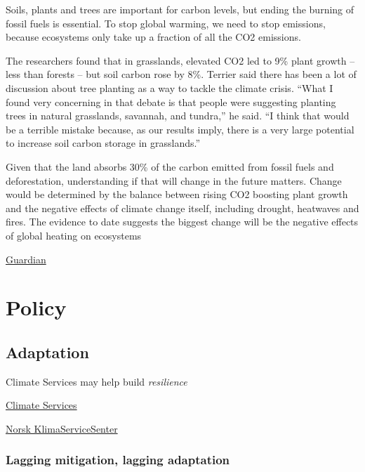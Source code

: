 \documentclass[
]{book}
\begin{document}
Soils, plants and trees are important for carbon levels,
but ending the burning of fossil fuels is essential.
To stop global warming, we need to stop emissions,
because ecosystems only take up a fraction of all the CO2 emissions.

The researchers found that in grasslands, elevated CO2 led to 9\% plant growth -- less than forests -- but soil carbon rose by 8\%. Terrier said there has been a lot of discussion about tree planting as a way to tackle the climate crisis. ``What I found very concerning in that debate is that people were suggesting planting trees in natural grasslands, savannah, and tundra,'' he said. ``I think that would be a terrible mistake because, as our results imply, there is a very large potential to increase soil carbon storage in grasslands.''

Given that the land absorbs 30\% of the carbon emitted from fossil fuels and deforestation, understanding if that will change in the future matters.
Change would be determined by the balance between rising CO2 boosting plant growth and the negative effects of climate change itself, including drought, heatwaves and fires. The evidence to date suggests the biggest change will be the negative effects of global heating on ecosystems

\href{https://www.theguardian.com/environment/2021/mar/24/soils-ability-to-absorb-carbon-emissions-may-be-overestimated-study}{Guardian}

\hypertarget{part-policy}{%
\part{Policy}\label{part-policy}}

\hypertarget{adaptation}{%
\chapter{Adaptation}\label{adaptation}}

Climate Services may help build \emph{resilience}

\href{https://gfcs.wmo.int/}{Climate Services}

\href{https://klimaservicesenter.no/faces/desktop/index.xhtml}{Norsk KlimaServiceSenter}

\hypertarget{lagging-mitigation-lagging-adaptation}{%
\section{Lagging mitigation, lagging adaptation}\label{lagging-mitigation-lagging-adaptation}}
\end{document}
